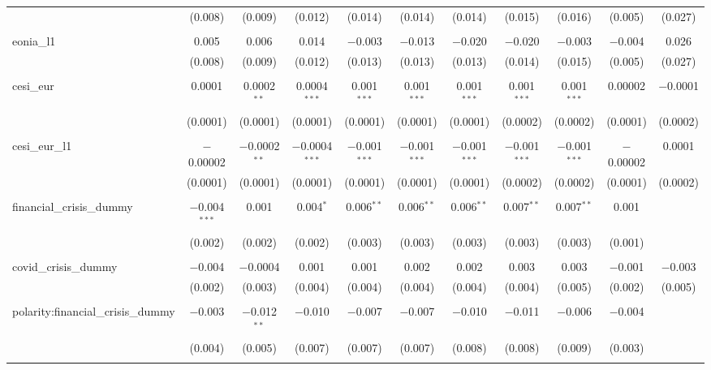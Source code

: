 \begin{table}[!htbp]
\begin{adjustbox}{width=1.25\textwidth}
\begin{tabular}{@{\extracolsep{5pt}}lcccccccccc}
  & (0.008) & (0.009) & (0.012) & (0.014) & (0.014) & (0.014) & (0.015) & (0.016) & (0.005) & (0.027) \\ 
  & & & & & & & & & & \\ 
 eonia\_l1 & 0.005 & 0.006 & 0.014 & $-$0.003 & $-$0.013 & $-$0.020 & $-$0.020 & $-$0.003 & $-$0.004 & 0.026 \\ 
  & (0.008) & (0.009) & (0.012) & (0.013) & (0.013) & (0.013) & (0.014) & (0.015) & (0.005) & (0.027) \\ 
  & & & & & & & & & & \\ 
 cesi\_eur & 0.0001 & 0.0002$^{**}$ & 0.0004$^{***}$ & 0.001$^{***}$ & 0.001$^{***}$ & 0.001$^{***}$ & 0.001$^{***}$ & 0.001$^{***}$ & 0.00002 & $-$0.0001 \\ 
  & (0.0001) & (0.0001) & (0.0001) & (0.0001) & (0.0001) & (0.0001) & (0.0002) & (0.0002) & (0.0001) & (0.0002) \\ 
  & & & & & & & & & & \\ 
 cesi\_eur\_l1 & $-$0.00002 & $-$0.0002$^{**}$ & $-$0.0004$^{***}$ & $-$0.001$^{***}$ & $-$0.001$^{***}$ & $-$0.001$^{***}$ & $-$0.001$^{***}$ & $-$0.001$^{***}$ & $-$0.00002 & 0.0001 \\ 
  & (0.0001) & (0.0001) & (0.0001) & (0.0001) & (0.0001) & (0.0001) & (0.0002) & (0.0002) & (0.0001) & (0.0002) \\ 
  & & & & & & & & & & \\ 
 financial\_crisis\_dummy & $-$0.004$^{***}$ & 0.001 & 0.004$^{*}$ & 0.006$^{**}$ & 0.006$^{**}$ & 0.006$^{**}$ & 0.007$^{**}$ & 0.007$^{**}$ & 0.001 &  \\ 
  & (0.002) & (0.002) & (0.002) & (0.003) & (0.003) & (0.003) & (0.003) & (0.003) & (0.001) &  \\ 
  & & & & & & & & & & \\ 
 covid\_crisis\_dummy & $-$0.004 & $-$0.0004 & 0.001 & 0.001 & 0.002 & 0.002 & 0.003 & 0.003 & $-$0.001 & $-$0.003 \\ 
  & (0.002) & (0.003) & (0.004) & (0.004) & (0.004) & (0.004) & (0.004) & (0.005) & (0.002) & (0.005) \\ 
  & & & & & & & & & & \\ 
 polarity:financial\_crisis\_dummy & $-$0.003 & $-$0.012$^{**}$ & $-$0.010 & $-$0.007 & $-$0.007 & $-$0.010 & $-$0.011 & $-$0.006 & $-$0.004 &  \\ 
  & (0.004) & (0.005) & (0.007) & (0.007) & (0.007) & (0.008) & (0.008) & (0.009) & (0.003) &  \\ 
  & & & & & & & & & & \\ 

\end{tabular}
\end{adjustbox}
\end{table}
